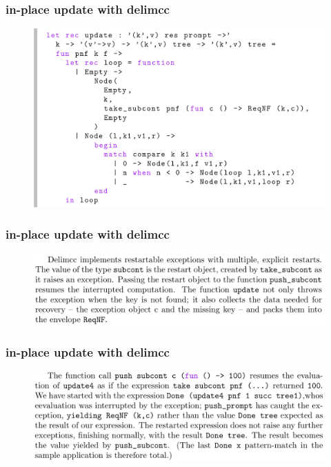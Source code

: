 \documentclass{beamer}
\begin{document}
  \begin{frame}
    \frametitle{in-place update with delimcc}    
    \begin{figure}[ht]
      \begin{center}        
        \includegraphics[width=\textwidth,height=0.8\textheight,keepaspectratio]{pipelinefigures/CodeSamplesDelimCCInplaceUpdateTraversal.pdf}
      \end{center}      
    \end{figure}
  \end{frame}
  \begin{frame}
    \frametitle{in-place update with delimcc}    
    \begin{figure}[ht]
      \begin{center}        
        \includegraphics[width=\textwidth,height=0.8\textheight,keepaspectratio]{pipelinefigures/CodeSamplesDelimCCExplanationI.pdf}
      \end{center}      
    \end{figure}
  \end{frame}
  \begin{frame}
    \frametitle{in-place update with delimcc}    
    \begin{figure}[ht]
      \begin{center}        
        \includegraphics[width=\textwidth,height=0.8\textheight,keepaspectratio]{pipelinefigures/CodeSamplesDelimCCExplanationII.pdf}
      \end{center}      
    \end{figure}
  \end{frame}
\end{document}
